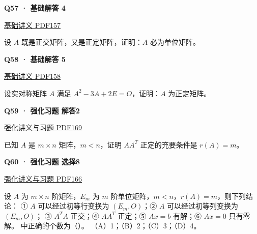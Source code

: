 \documentclass[UTF8,fontset=fandol,11pt,a4paper]{ctexart}
\newcommand{\source}[1]{{\footnotesize\color{Muted}#1\par}}
\newcommand{\qtitle}[2]{\par\needspace{5\baselineskip}\hypertarget{#1}{}\label{#1}\textbf{#2}\par}
\begin{document}
\begin{minipage}{\linewidth}
\qtitle{B-SA-04}{Q57 · 基础解答 4}
\source{\href{file:///Users/skyintelligence/Desktop/\%E5\%BE\%97\%E8\%AF\%BB\%E4\%B8\%AA\%E7\%A0\%94-\%E5\%8C\%97\%E5\%A4\%A7\%E8\%BD\%AF\%E5\%BE\%AE/\%E6\%95\%B0\%E5\%AD\%A6\%20150/\%E8\%AE\%B2\%E4\%B9\%89/\%E3\%80\%90\%E4\%B8\%80\%E9\%AB\%98\%E6\%95\%B0Kira\%E3\%80\%9127\%E8\%80\%83\%E7\%A0\%94\%E7\%BA\%BF\%E4\%BB\%A3\%E5\%9F\%BA\%E7\%A1\%80\%E8\%AE\%B2\%E4\%B9\%89\%26\%E4\%B9\%A0\%E9\%A2\%98-\%E7\%94\%B5\%E5\%AD\%90\%E7\%89\%88.pdf\#page=157}{基础讲义 PDF157}}
设 $A$ 既是正交矩阵，又是正定矩阵，证明：$A$ 必为单位矩阵。
\end{minipage}\par\vspace{7mm}
\begin{minipage}{\linewidth}
\qtitle{B-SA-05}{Q58 · 基础解答 5}
\source{\href{file:///Users/skyintelligence/Desktop/\%E5\%BE\%97\%E8\%AF\%BB\%E4\%B8\%AA\%E7\%A0\%94-\%E5\%8C\%97\%E5\%A4\%A7\%E8\%BD\%AF\%E5\%BE\%AE/\%E6\%95\%B0\%E5\%AD\%A6\%20150/\%E8\%AE\%B2\%E4\%B9\%89/\%E3\%80\%90\%E4\%B8\%80\%E9\%AB\%98\%E6\%95\%B0Kira\%E3\%80\%9127\%E8\%80\%83\%E7\%A0\%94\%E7\%BA\%BF\%E4\%BB\%A3\%E5\%9F\%BA\%E7\%A1\%80\%E8\%AE\%B2\%E4\%B9\%89\%26\%E4\%B9\%A0\%E9\%A2\%98-\%E7\%94\%B5\%E5\%AD\%90\%E7\%89\%88.pdf\#page=158}{基础讲义 PDF158}}
设实对称矩阵 $A$ 满足 $A^2-3A+2E=O$，证明：$A$ 为正定矩阵。
\end{minipage}\par\vspace{7mm}
\begin{minipage}{\linewidth}
\qtitle{R-LONG-02}{Q59 · 强化习题 解答2}
\source{\href{file:///Users/skyintelligence/Desktop/\%E5\%BE\%97\%E8\%AF\%BB\%E4\%B8\%AA\%E7\%A0\%94-\%E5\%8C\%97\%E5\%A4\%A7\%E8\%BD\%AF\%E5\%BE\%AE/\%E6\%95\%B0\%E5\%AD\%A6\%20150/Kira\%C2\%B727\%E7\%BA\%BF\%E6\%80\%A7\%E4\%BB\%A3\%E6\%95\%B0\%E5\%BC\%BA\%E5\%8C\%96\%E8\%AE\%B2\%E4\%B9\%89\%2B\%E4\%B9\%A0\%E9\%A2\%98.pdf\#page=169}{强化讲义与习题 PDF169}}
已知 $A$ 是 $m\times n$ 矩阵，$m<n$，证明 $AA^T$ 正定的充要条件是 $r(A)=m$。
\end{minipage}\par\vspace{7mm}
\begin{minipage}{\linewidth}
\qtitle{R-MC-08}{Q60 · 强化习题 选择8}
\source{\href{file:///Users/skyintelligence/Desktop/\%E5\%BE\%97\%E8\%AF\%BB\%E4\%B8\%AA\%E7\%A0\%94-\%E5\%8C\%97\%E5\%A4\%A7\%E8\%BD\%AF\%E5\%BE\%AE/\%E6\%95\%B0\%E5\%AD\%A6\%20150/Kira\%C2\%B727\%E7\%BA\%BF\%E6\%80\%A7\%E4\%BB\%A3\%E6\%95\%B0\%E5\%BC\%BA\%E5\%8C\%96\%E8\%AE\%B2\%E4\%B9\%89\%2B\%E4\%B9\%A0\%E9\%A2\%98.pdf\#page=166}{强化讲义与习题 PDF166}}
设 $A$ 为 $m\times n$ 阶矩阵，$E_m$ 为 $m$ 阶单位矩阵，$m<n$，$r(A)=m$，则下列结论：
① $A$ 可以经过初等行变换为 $(E_m,O)$；② $A$ 可以经过初等列变换为 $(E_m,O)$；
③ $A^TA$ 正交；④ $AA^T$ 正定；⑤ $Ax=b$ 有解；⑥ $Ax=0$ 只有零解。
中正确的个数为（\quad）。
（A）1；（B）2；（C）3；（D）4。
\end{minipage}\par\vspace{7mm}
\end{document}
